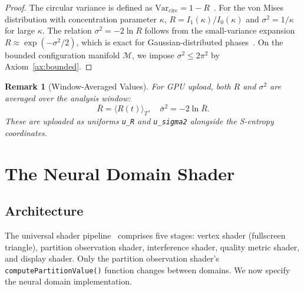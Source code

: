 \documentclass[11pt,twocolumn,a4paper]{article}
\newtheorem{remark}[theorem]{Remark}
\begin{document}
\begin{proof}
The circular variance is defined as $\mathrm{Var}_{\mathrm{circ}} = 1 - R$~\cite{acebron2005}.
For the von Mises distribution with concentration parameter $\kappa$, $R = I_1(\kappa)/I_0(\kappa)$ and $\sigma^2 = 1/\kappa$ for large $\kappa$.
The relation $\sigma^2 = -2\ln R$ follows from the small-variance expansion $R \approx \exp(-\sigma^2/2)$, which is exact for Gaussian-distributed phases~\cite{strogatz2000}.
On the bounded configuration manifold $\mathcal{M}$, we impose $\sigma^2 \leq 2\pi^2$ by Axiom~\ref{ax:bounded}.
\end{proof}

\begin{remark}[Window-Averaged Values]
For GPU upload, both $R$ and $\sigma^2$ are averaged over the analysis window:
\begin{equation}
\bar{R} = \langle R(t) \rangle_T, \quad \bar{\sigma}^2 = -2\ln\bar{R}.
\end{equation}
These are uploaded as uniforms \texttt{u\_R} and \texttt{u\_sigma2} alongside the S-entropy coordinates.
\end{remark}



\section{The Neural Domain Shader}
\label{sec:shader}

\subsection{Architecture}

The universal shader pipeline~\cite{sachikonye2026gpu} comprises five stages: vertex shader (fullscreen triangle), partition observation shader, interference shader, quality metric shader, and display shader.
Only the partition observation shader's \texttt{computePartitionValue()} function changes between domains.
We now specify the neural domain implementation.
\end{document}
